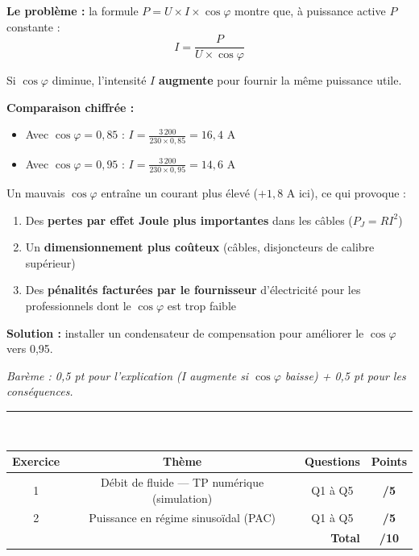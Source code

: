 \documentclass[a4paper,11pt]{article}
\begin{document}
\begin{corrbox}
\textbf{Le problème :} la formule $P = U \times I \times \cos\varphi$ montre que, à puissance active $P$ constante :
\[
I = \frac{P}{U \times \cos\varphi}
\]

Si $\cos\varphi$ diminue, l'intensité $I$ \textbf{augmente} pour fournir la même puissance utile.

\textbf{Comparaison chiffrée :}
\begin{itemize}[nosep]
  \item Avec $\cos\varphi = 0{,}85$ : $I = \frac{3\,200}{230 \times 0{,}85} = 16{,}4$ A
  \item Avec $\cos\varphi = 0{,}95$ : $I = \frac{3\,200}{230 \times 0{,}95} = 14{,}6$ A
\end{itemize}

Un mauvais $\cos\varphi$ entraîne un courant plus élevé ($+1{,}8$ A ici), ce qui provoque :
\begin{enumerate}[nosep]
  \item Des \textbf{pertes par effet Joule plus importantes} dans les câbles ($P_J = RI^2$)
  \item Un \textbf{dimensionnement plus coûteux} (câbles, disjoncteurs de calibre supérieur)
  \item Des \textbf{pénalités facturées par le fournisseur} d'électricité pour les professionnels dont le $\cos\varphi$ est trop faible
\end{enumerate}

\textbf{Solution :} installer un condensateur de compensation pour améliorer le $\cos\varphi$ vers 0,95.

\smallskip
\textit{Barème : 0,5 pt pour l'explication (I augmente si $\cos\varphi$ baisse) + 0,5 pt pour les conséquences.}
\end{corrbox}

\vfill

\begin{center}
\textcolor{rouge}{\rule{12cm}{1pt}}\\[8pt]
\begin{tabular}{|c|c|c|c|}
\hline
\textbf{Exercice} & \textbf{Thème} & \textbf{Questions} & \textbf{Points} \\
\hline
1 & Débit de fluide — TP numérique (simulation) & Q1 à Q5 & \textbf{/5} \\
\hline
2 & Puissance en régime sinusoïdal (PAC) & Q1 à Q5 & \textbf{/5} \\
\hline
\multicolumn{3}{|r|}{\textbf{Total}} & \textbf{/10} \\
\hline
\end{tabular}
\end{center}
\end{document}
